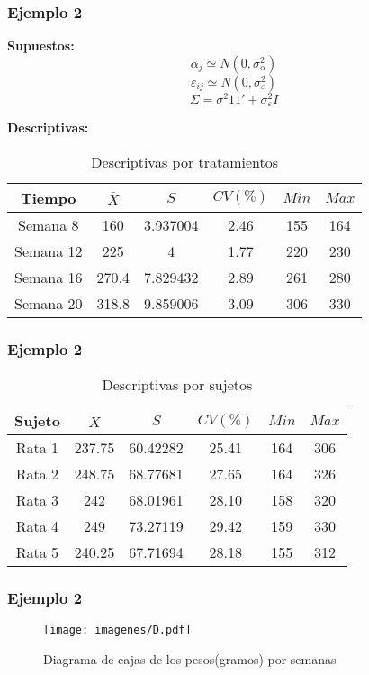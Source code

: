 \documentclass[12pt]{beamer}
\begin{document}
\begin{frame}
\frametitle{Ejemplo 2}
\textbf{Supuestos:} 
$$\alpha_j \simeq N(0,\sigma^2_\alpha)$$
$$\varepsilon_{ij} \simeq N(0,\sigma^2_\varepsilon)$$
$$\Sigma =\sigma^2 11' + \sigma^2_\varepsilon I$$

\textbf{Descriptivas:}
\begin{table}[htbp]
  \centering
\resizebox{12cm}{!} {
\begin{tabular}{|c|c|c|c|c|c|}
\hline 
\textbf{Tiempo} & \textbf{$\bar{X}$} & \textbf{$S$} & \textbf{$CV(\%)$} & \textbf{$Min$} & \textbf{$Max$}\\ 
\hline 
Semana 8 & 160 &3.937004& 2.46& 155 & 164\\
Semana 12 & 225 &4& 1.77& 220 & 230\\
Semana 16 & 270.4 &7.829432& 2.89& 261 & 280\\
Semana 20 & 318.8 &9.859006& 3.09& 306 & 330 \\
\hline 
\end{tabular} 
}
\caption{Descriptivas por tratamientos}
\label{tab:addlabel}%
\end{table}%
\end{frame}

\begin{frame}
\frametitle{Ejemplo 2}
\begin{table}[htbp]
  \centering
\resizebox{12cm}{!} {
\begin{tabular}{|c|c|c|c|c|c|}
\hline 
\textbf{Sujeto} & \textbf{$\bar{X}$} & \textbf{$S$} & \textbf{$CV(\%)$} & \textbf{$Min$} & \textbf{$Max$}\\ 
\hline 
Rata 1 & 237.75 &60.42282 & 25.41& 164 & 306\\
Rata 2 & 248.75 &68.77681 & 27.65& 164 & 326\\
Rata 3 & 242    &68.01961 & 28.10& 158 & 320\\
Rata 4 & 249    &73.27119 & 29.42& 159 & 330 \\
Rata 5 & 240.25 &67.71694 & 28.18& 155 & 312 \\
\hline 
\end{tabular} 
}
\caption{Descriptivas por sujetos}
\label{tab:addlabel}%
\end{table}%
\end{frame}

\begin{frame}
\frametitle{Ejemplo 2}
\begin{figure}[h!]
\caption{Diagrama de cajas de los pesos(gramos) por semanas}
  \centering
  \texttt{[image: imagenes/D.pdf]}
\end{figure}
\end{frame}
\end{document}
